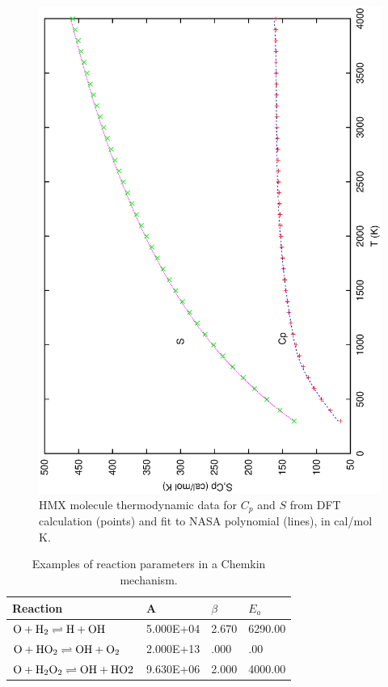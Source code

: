 \begin{figure}
\begin{center}
\includegraphics[scale=0.5,angle=270]{hmx.eps}
\end{center}
\caption{HMX molecule thermodynamic data for $C_p$ and $S$ from DFT
calculation (points) and fit to NASA polynomial (lines), in cal/mol K.}
\label{hmx-therm}
\end{figure}

\begin{table}
\caption{Examples of reaction parameters in a Chemkin mechanism.}
\label{chemkin-reaction}
\begin{center}
\begin{tabular}{llll}\hline\hline
Reaction & A & $\beta$ & $E_a$ \\ \hline
$\mathrm{O}+\mathrm{H_2}\rightleftharpoons \mathrm{H}+\mathrm{OH}$       
 & 5.000E+04 &  2.670 &  6290.00\\
$\mathrm{O}+\mathrm{HO_2}\rightleftharpoons \mathrm{OH}+\mathrm{O_2}$     
 & 2.000E+13 &   .000 &      .00\\ 
$\mathrm{O}+\mathrm{H_2O_2}\rightleftharpoons \mathrm{OH}+\mathrm{HO2}$   
 & 9.630E+06 &  2.000 &  4000.00\\
\hline\hline
\end{tabular}
\end{center}
\end{table}


